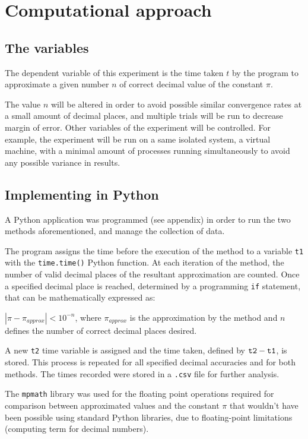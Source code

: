 \section{Computational approach}

\subsection{The variables}
The dependent variable of this experiment is the time taken $t$ by the program to approximate a given number $n$ of correct decimal value of the constant $\pi$. 

The value $n$ will be altered in order to avoid possible similar convergence rates at a small amount of decimal places, and multiple trials will be run to decrease margin of error. Other variables of the experiment will be controlled. For example, the experiment will be run on a same isolated system, a virtual machine, with a minimal amount of processes running simultaneously to avoid any possible variance in results. 


\subsection{Implementing in Python}

A Python application was programmed (see appendix) in order to run the two methods aforementioned, and manage the collection of data.

The program assigns the time before the execution of the method to a variable \verb|t1| with the \verb|time.time()| Python function. At each iteration of the method, the number of valid decimal places of the resultant approximation are counted. Once a specified decimal place is reached, determined by a programming \verb|if| statement, that can be mathematically expressed as:

$| \pi - \pi_{approx} | < 10^{-n}$, where $\pi_{approx}$ is the approximation by the method and $n$ defines the number of correct decimal places desired.

A new \verb|t2| time variable is assigned and the time taken, defined by $\verb|t2| - \verb|t1|$, is stored. This process is repeated for all specified decimal accuracies and for both methods. The times recorded were stored in a \verb|.csv| file for further analysis.

The \verb|mpmath| library was used for the floating point operations required for comparison between approximated values and the constant $\pi$ that wouldn't have been possible using standard Python libraries, due to floating-point limitations (computing term for decimal numbers). \cite{mpmath}